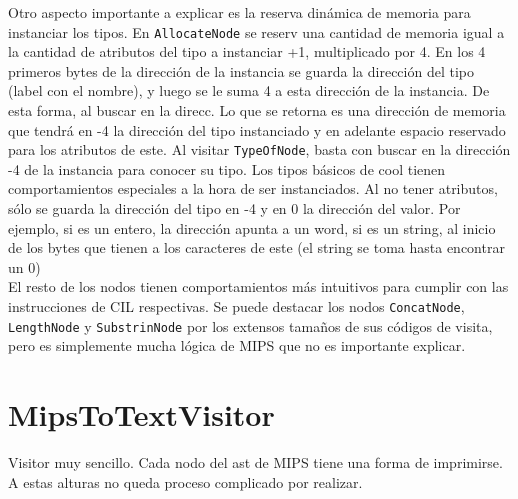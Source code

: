 \documentclass[a4paper,12pt]{article}
\def\code#1{\texttt{#1}}
\begin{document}
Otro aspecto importante a explicar es la reserva dinámica de memoria para instanciar los tipos. En \code{AllocateNode} se reserv una cantidad de memoria igual a la cantidad de atributos del tipo a instanciar +1, multiplicado por 4. En los 4 primeros bytes de la dirección de la instancia se guarda la dirección del tipo (label con el nombre), y luego se le suma 4 a esta dirección de la instancia. De esta forma, al buscar en la direcc. Lo que se retorna es una dirección de memoria que tendrá en -4 la dirección del tipo instanciado y en adelante espacio reservado para los atributos de este. Al visitar \code{TypeOfNode}, basta con buscar en la dirección -4 de la instancia para conocer su tipo. Los tipos básicos de cool tienen comportamientos especiales a la hora de ser instanciados. Al no tener atributos, sólo se guarda la dirección del tipo en -4 y en 0 la dirección del valor. Por ejemplo, si es un entero, la dirección apunta a un word, si es un string, al inicio de los bytes que tienen a los caracteres de este (el string se toma hasta encontrar un 0)\\

El resto de los nodos tienen comportamientos más intuitivos para cumplir con las instrucciones de CIL respectivas. Se puede destacar los nodos \code{ConcatNode}, \code{LengthNode} y \code{SubstrinNode} por los extensos tamaños de sus códigos de visita, pero es simplemente mucha lógica de MIPS que no es importante explicar.

\section*{MipsToTextVisitor}
Visitor muy sencillo. Cada nodo del ast de MIPS tiene una forma de imprimirse. A estas alturas no queda proceso complicado por realizar.
\end{document}
